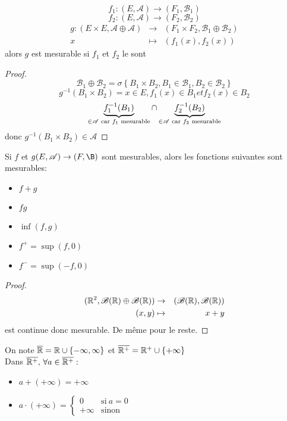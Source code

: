 \begin{prop}
	$$f_1 : (E,\mathscr{A}) \rightarrow (F_1,\mathscr{B_1})$$
	$$f_2 : (E,\mathscr{A}) \rightarrow (F_2,\mathscr{B_2})$$
	\begin{eqnarray*}
		g: (E \times E,\mathscr{A} \oplus \mathscr{A}) &\rightarrow& (F_1 \times F_2,\mathscr{B_1} \oplus \mathscr{B_2})\\
		x &\mapsto& (f_1(x), f_2(x))
	\end{eqnarray*}
	alors $g$ est mesurable si $f_1$ et $f_2$ le sont
\end{prop}

\begin{proof}
	$$\mathscr{B_1} \oplus \mathscr{B_2} = \sigma \left\{ B_1 \times B_2, B_1 \in \mathscr{B_1}, B_2 \in \mathscr{B_2} \right\}$$
	$$g^{-1}(B_1 \times B_2) = {x \in E, f_1(x) \in B_1 et f_2(x) \in B_2  }$$
	$$ \underbrace{f_1^{-1}(B_1)}_{\in \mathscr{A} \text{ car } f_1 \text{ mesurable}} \cap \underbrace{f_2^{-1}(B_2)}_{\in \mathscr{A} \text{ car } f_2 \text{ mesurable}}$$
	donc $g^{-1}(B_1 \times B_2) \in \mathscr{A}$
\end{proof}

\begin{prop}
	Si $f$ et $g (E,\triA) \rightarrow (F,\B)$
	sont mesurables, alors les fonctions suivantes sont mesurables:
	\begin{itemize}
		\item $f + g$
		\item $fg$
		\item $\inf(f,g)$
		\item $f^+ = \sup(f,0)$
		\item $f^- = \sup(-f,0)$
	\end{itemize}
\end{prop}

\begin{proof}
	\begin{eqnarray*}
		(\mathbb{R}^2, \mathscr{B}(\mathbb{R}) \oplus \mathscr{B}(\mathbb{R}))   &\rightarrow& (\mathscr{B}(\mathbb{R}), \mathscr{B}(\mathbb{R})) \\
		(x,y) &\mapsto& x + y
	\end{eqnarray*}
	est continue donc mesurable. De même pour le reste.
\end{proof}


\begin{definition}
	On note $\overline{\mathbb{R}} = \mathbb{R} \cup \{ -\infty, \infty \}$ et $\overline{\mathbb{R}^+} = \mathbb{R}^+ \cup \{  +\infty \}$\\
	Dans $\overline{\mathbb{R}^+} , \, \forall a \in \overline{\mathbb{R}^+}: $
	\begin{itemize}
		\item $a + (+\infty) = +\infty$
		\item
		      $a \cdot (+\infty) = \left\{ \begin{array}{cc}
				      0       & \text{si} \  a = 0 \\
				      +\infty & \text{sinon}
			      \end{array}\right.$
	\end{itemize}
\end{definition}

